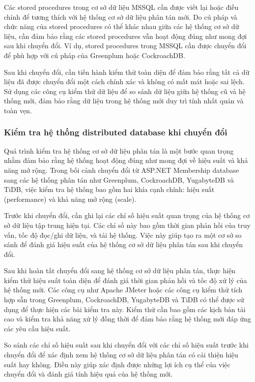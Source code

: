 \documentclass[14pt]{article}
\begin{document}
Các stored procedures trong cơ sở dữ liệu MSSQL cần được viết lại hoặc điều chỉnh để tương thích với hệ thống cơ sở dữ liệu phân tán mới. Do cú pháp và chức năng của stored procedures có thể khác nhau giữa các hệ thống cơ sở dữ liệu, cần đảm bảo rằng các stored procedures vẫn hoạt động đúng như mong đợi sau khi chuyển đổi. Ví dụ, stored procedures trong MSSQL cần được chuyển đổi để phù hợp với cú pháp của Greenplum hoặc CockroachDB.

Sau khi chuyển đổi, cần tiến hành kiểm thử toàn diện để đảm bảo rằng tất cả dữ liệu đã được chuyển đổi một cách chính xác và không có mất mát hoặc sai lệch. Sử dụng các công cụ kiểm thử dữ liệu để so sánh dữ liệu giữa hệ thống cũ và hệ thống mới, đảm bảo rằng dữ liệu trong hệ thống mới duy trì tính nhất quán và toàn vẹn.

\subsubsection{Kiểm tra hệ thống distributed database khi chuyển đổi}

Quá trình kiểm tra hệ thống cơ sở dữ liệu phân tán là một bước quan trọng nhằm đảm bảo rằng hệ thống hoạt động đúng như mong đợi về hiệu suất và khả năng mở rộng. Trong bối cảnh chuyển đổi từ ASP.NET Membership database sang các hệ thống phân tán như Greenplum, CockroachDB, YugabyteDB và TiDB, việc kiểm tra hệ thống bao gồm hai khía cạnh chính: hiệu suất (performance) và khả năng mở rộng (scale).

Trước khi chuyển đổi, cần ghi lại các chỉ số hiệu suất quan trọng của hệ thống cơ sở dữ liệu tập trung hiện tại. Các chỉ số này bao gồm thời gian phản hồi của truy vấn, tốc độ đọc/ghi dữ liệu, và tải hệ thống. Việc này giúp tạo ra một cơ sở so sánh để đánh giá hiệu suất của hệ thống cơ sở dữ liệu phân tán sau khi chuyển đổi.

Sau khi hoàn tất chuyển đổi sang hệ thống cơ sở dữ liệu phân tán, thực hiện kiểm thử hiệu suất toàn diện để đánh giá thời gian phản hồi và tốc độ xử lý của hệ thống mới. Các công cụ như Apache JMeter hoặc các công cụ kiểm thử tích hợp sẵn trong Greenplum, CockroachDB, YugabyteDB và TiDB có thể được sử dụng để thực hiện các bài kiểm tra này. Kiểm thử cần bao gồm các kịch bản tải cao và kiểm tra khả năng xử lý đồng thời để đảm bảo rằng hệ thống mới đáp ứng các yêu cầu hiệu suất.

So sánh các chỉ số hiệu suất sau khi chuyển đổi với các chỉ số hiệu suất trước khi chuyển đổi để xác định xem hệ thống cơ sở dữ liệu phân tán có cải thiện hiệu suất hay không. Điều này giúp xác định được những lợi ích cụ thể của việc chuyển đổi và đánh giá tính hiệu quả của hệ thống mới.
\end{document}
